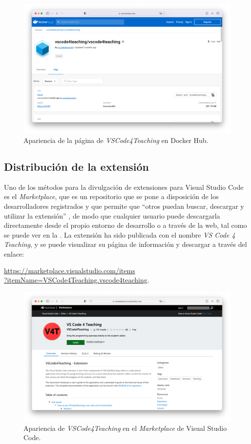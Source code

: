 \begin{figure}[ht]
    \centering
    \includegraphics[width=\textwidth]{imagenes/utilizadas/4-5-distribDespliegue/capturaDockerHub.png}
    \caption{Apariencia de la página de \textit{VSCode4Teaching} en Docker Hub.}
    \label{fig:distrib1}
\end{figure}

\subsection{Distribución de la extensión}
Uno de los métodos para la divulgación de extensiones para Visual Studio Code es el \textit{Marketplace}, que es un repositorio que se pone a disposición de los desarrolladores registrados y que permite que ``otros puedan buscar, descargar y utilizar la extensión'' \cite{Tec_VSCPublish}, de modo que cualquier usuario puede descargarla directamente desde el propio entorno de desarrollo o a través de la web, tal como se puede ver en la . La extensión ha sido publicada con el nombre \textit{VS Code 4 Teaching}, y se puede visualizar su página de información y descargar a través del enlace:
\vspace{-0.5\baselineskip}
\begin{center}
    \href{https://marketplace.visualstudio.com/items?itemName=VSCode4Teaching.vscode4teaching}{https://marketplace.visualstudio.com/items \\ ?itemName=VSCode4Teaching.vscode4teaching}.
\end{center}
\vspace{-0.5\baselineskip}


\begin{figure}[ht]
    \centering
    \includegraphics[width=\textwidth]{imagenes/utilizadas/4-5-distribDespliegue/capturaVSCodeMarketplace.png}
    \caption{Apariencia de \textit{VSCode4Teaching} en el \textit{Marketplace} de Visual Studio Code.}
    \label{fig:distrib2}
\end{figure}

